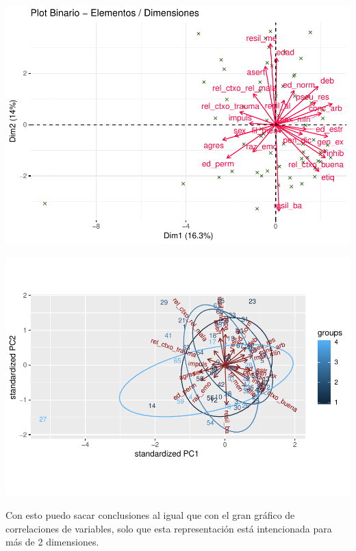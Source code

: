 \documentclass[]{article}
\newenvironment{Shaded}{\begin{snugshade}}{\end{snugshade}}
\newcommand{\DataTypeTok}[1]{\textcolor[rgb]{0.13,0.29,0.53}{#1}}
\newcommand{\KeywordTok}[1]{\textcolor[rgb]{0.13,0.29,0.53}{\textbf{#1}}}
\newcommand{\NormalTok}[1]{#1}
\newcommand{\OperatorTok}[1]{\textcolor[rgb]{0.81,0.36,0.00}{\textbf{#1}}}
\newcommand{\OtherTok}[1]{\textcolor[rgb]{0.56,0.35,0.01}{#1}}
\begin{document}
\includegraphics{codigo_files/figure-latex/PCA_eigenvalues_graph-2.pdf}

\begin{Shaded}
\end{Shaded}

\includegraphics{codigo_files/figure-latex/PCA_eigenvalues_graph-3.pdf}

Con esto puedo sacar conclusiones al igual que con el gran gráfico de
correlaciones de variables, solo que esta representación está
intencionada para más de 2 dimensiones.
\end{document}
